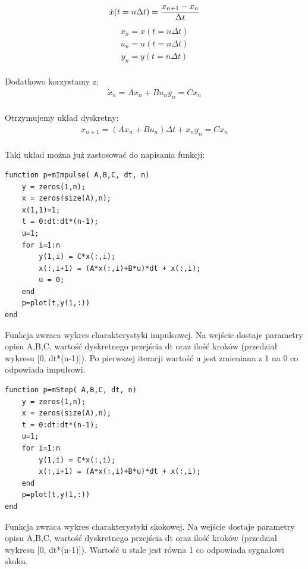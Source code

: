 \documentclass[a4paper,10pt]{article}
\begin{document}
	\begin{eqnarray} 
		\dot{x}(t=n \Delta t ) = {x_{n+1}-x_{n} \over {\Delta t}}
	\end{eqnarray}
	\begin{eqnarray} 
		x_{n}=x(t=n \Delta t)
	\end{eqnarray}
	\begin{eqnarray} 
		u_{n}=u(t=n \Delta t)
	\end{eqnarray}
	\begin{eqnarray} 
		y_{n}=y(t=n \Delta t)
	\end{eqnarray}\\
	Dodatkowo korzystamy z:\\
	\begin{eqnarray} 
		\nonumber \dot{x}_{n}=Ax_{n}+Bu_{n}
		\nonumber y_{n}=Cx_{n}
	\end{eqnarray}\\
	Otrzymujemy układ dyskretny:\\
	\begin{eqnarray} 
		\nonumber {x}_{n+1}=(Ax_{n}+Bu_{n}) \Delta t +x_{n}
		\nonumber y_{n}=Cx_{n}
	\end{eqnarray}\\
	Taki układ można już zastosować do napisania funkcji:
\begin{lstlisting}[caption=funkcja mImpulse.m]
function p=mImpulse( A,B,C, dt, n)
	y = zeros(1,n);
	x = zeros(size(A),n);
	x(1,1)=1;
	t = 0:dt:dt*(n-1);
	u=1;
	for i=1:n
		y(1,i) = C*x(:,i);
		x(:,i+1) = (A*x(:,i)+B*u)*dt + x(:,i);
		u = 0;
	end
	p=plot(t,y(1,:))
end
\end{lstlisting}
Funkcja zwraca wykres charakterystyki impulsowej. Na wejście dostaje parametry opisu A,B,C,
wartość dyskretnego przejścia dt oraz ilość kroków (przedział wykresu [0, dt*(n-1)]). Po pierwszej
iteracji wartość u jest zmieniana z 1 na 0 co odpowiada impulsowi. %

\begin{lstlisting}[caption=funkcja mStep.m]
function p=mStep( A,B,C, dt, n)
	y = zeros(1,n);
	x = zeros(size(A),n);
	t = 0:dt:dt*(n-1);
	u=1;
	for i=1:n
		y(1,i) = C*x(:,i);
		x(:,i+1) = (A*x(:,i)+B*u)*dt + x(:,i);
	end
	p=plot(t,y(1,:))
end
\end{lstlisting}
Funkcja zwraca wykres charakterystyki skokowej. Na wejście dostaje parametry opisu A,B,C, wartość
dyskretnego przejścia dt oraz ilość kroków (przedział wykresu [0, dt*(n-1)]). Wartość u stale jest
równa 1 co odpowiada sygnałowi skoku.%
\end{document}
